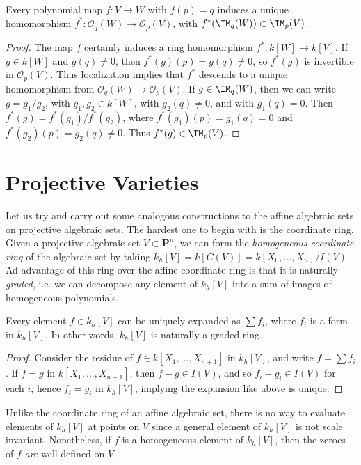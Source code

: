 \begin{prop}
    Every polynomial map $f: V \to W$ with $f(p) = q$ induces a unique homomorphism $f^*: \mathcal{O}_q(W) \to \mathcal{O}_p(V)$, with $f^*(\IM_q(W)) \subset \IM_p(V)$.
\end{prop}
\begin{proof}
    The map $f$ certainly induces a ring homomorphism $f^*: k[W] \to k[V]$. If $g \in k[W]$ and $g(q) \neq 0$, then $f^*(g)(p) = g(q) \neq 0$, so $f^*(g)$ is invertible in $\mathcal{O}_p(V)$. Thus localization implies that $f^*$ descends to a unique homomorphism from $\mathcal{O}_q(W) \to \mathcal{O}_p(V)$. If $g \in \IM_q(W)$, then we can write $g = g_1/g_2$, with $g_1,g_2 \in k[W]$, with $g_2(q) \neq 0$, and with $g_1(q) = 0$. Then $f^*(g) = f^*(g_1)/f^*(g_2)$, where $f^*(g_1)(p) = g_1(q) = 0$ and $f^*(g_2)(p) = g_2(q) \neq 0$. Thus $f^*(g) \in \IM_p(V)$.
\end{proof}

\section{Projective Varieties}

Let us try and carry out some analogous constructions to the affine algebraic sets on projective algebraic sets. The hardest one to begin with is the coordinate ring. Given a projective algebraic set $V \subset \mathbf{P}^n$, we can form the \emph{homogeneous coordinate ring} of the algebraic set by taking $k_h[V] = k[C(V)] = k[X_0,\dots,X_n]/I(V)$. Ad advantage of this ring over the affine coordinate ring is that it is naturally \emph{graded}, i.e. we can decompose any element of $k_h[V]$ into a sum of images of homogeneous polynomials.

\begin{prop}
    Every element $f \in k_h[V]$ can be uniquely expanded as $\sum f_i$, where $f_i$ is a form in $k_h[V]$. In other words, $k_h[V]$ is naturally a graded ring.
\end{prop}
\begin{proof}
    Consider the residue of $f \in k[X_1, \dots, X_{n+1}]$ in $k_h[V]$, and write $f = \sum f_i$. If $f = g$ in $k[X_1, \dots, X_{n+1}]$, then $f - g \in I(V)$, and so $f_i - g_i \in I(V)$ for each $i$, hence $f_i = g_i$ in $k_h[V]$, implying the expansion like above is unique.
\end{proof}

Unlike the coordinate ring of an affine algebraic set, there is no way to evaluate elements of $k_h[V]$ at points on $V$ since a general element of $k_h[V]$ is not scale invariant. Nonetheless, if $f$ is a homogeneous element of $k_h[V]$, then the zeroes of $f$ \emph{are} well defined on $V$.

